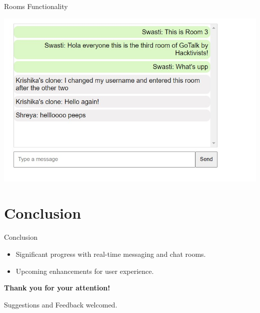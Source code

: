 \documentclass{beamer}
\begin{document}
\begin{frame}{Rooms Functionality}
\begin{minipage}[t]{0.3\textwidth}
            \includegraphics[width=\textwidth]{Pictures/room3.jpg}
        \end{minipage}
\end{frame}


\section{Conclusion}

\begin{frame}{Conclusion}
    \begin{itemize}
        \item Significant progress with real-time messaging and chat rooms.
        \item Upcoming enhancements for user experience.
    \end{itemize}
    \vfill
    \begin{center}
        \textbf{Thank you for your attention!}
    \end{center}
    \begin{center}
        Suggestions and Feedback welcomed.
    \end{center}
\end{frame}
\end{document}
